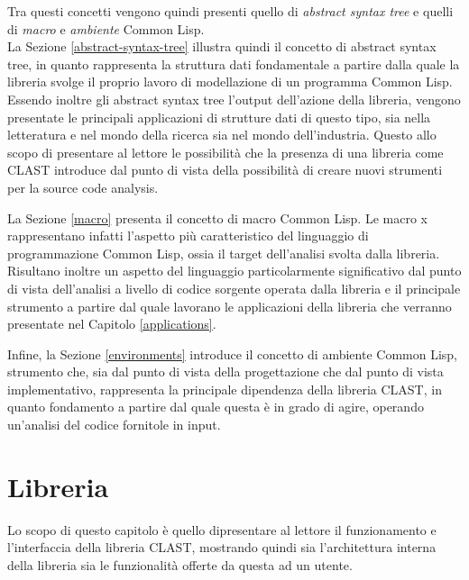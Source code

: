 \documentclass{book}
\begin{document}
Tra questi concetti vengono quindi presenti quello di
\textit{abstract syntax tree} e quelli di \textit{macro} e \textit{ambiente}
Common Lisp.\\

La Sezione \ref{abstract-syntax-tree} illustra quindi il concetto di abstract
syntax tree, in quanto rappresenta la struttura dati fondamentale a partire
dalla quale la libreria svolge il proprio lavoro di modellazione di un programma
Common Lisp. Essendo inoltre gli abstract syntax tree l'output dell'azione della
libreria, vengono presentate le principali applicazioni di strutture dati di
questo tipo, sia nella letteratura e nel mondo della ricerca sia nel mondo
dell'industria. Questo allo scopo di presentare al lettore le possibilità che la
presenza di una libreria come CLAST introduce dal punto di vista della
possibilità di creare nuovi strumenti per la source code analysis.

La Sezione \ref{macro} presenta il concetto di macro Common Lisp. Le macro x
rappresentano infatti l'aspetto più caratteristico del linguaggio di
programmazione Common Lisp, ossia il target dell'analisi svolta dalla libreria.
Risultano inoltre un aspetto del linguaggio particolarmente significativo dal
punto di vista dell'analisi a livello di codice sorgente operata dalla libreria
e il principale strumento a partire dal quale lavorano le applicazioni della
libreria che verranno presentate nel Capitolo \ref{applications}.

Infine, la Sezione \ref{environments} introduce il concetto di ambiente Common
Lisp, strumento che, sia dal punto di vista della progettazione che dal punto di
vista implementativo, rappresenta la principale dipendenza della libreria CLAST,
in quanto fondamento a partire dal quale questa è in grado di agire, operando
un'analisi del codice fornitole in input.






\endgroup

\begingroup
\let\clearpage\relax

\chapter{Libreria}
\label{library}

Lo scopo di questo capitolo è quello dipresentare al lettore il funzionamento e
l'interfaccia della libreria CLAST, mostrando quindi sia l'architettura interna
della libreria sia le funzionalità offerte da questa ad un utente.
\end{document}
